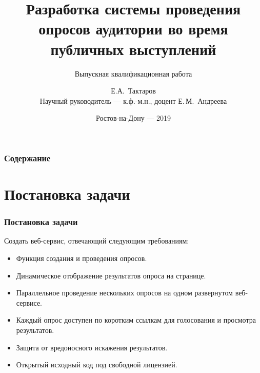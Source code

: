 \documentclass{beamer}
\title[Выпускная квалификационная работа]{Разработка системы проведения опросов аудитории во время публичных выступлений} %
\subtitle{Выпускная квалификационная работа}
\author{Е.А.~Тактаров\\Научный руководитель ---  к.ф.-м.н., доцент Е.\,М.~Андреева} %
\institute[ИММиКН] %
{
Южный Федеральный Университет\\
Институт математики, механики и компьютерных наук им. И.И. Воровича  \\ %
02.03.02 — Фундаментальная информатика и информационные технологии
}
\date{Ростов-на-Дону --- 2019} %
\begin{document}
\begin{frame}
\titlepage %
\end{frame}

\begin{frame}
\frametitle{Содержание} %
\tableofcontents %
\end{frame}


\section{Постановка задачи}
\begin{frame}
\frametitle{Постановка задачи}
Создать веб-сервис, отвечающий следующим требованиям:
\begin{itemize}
	\item Функция создания и проведения опросов. 
	\item Динамическое отображение результатов опроса на странице.
	\item Параллельное проведение нескольких опросов на одном развернутом веб-сервисе.
	\item Каждый опрос доступен по коротким ссылкам для голосования и просмотра результатов.
	\item Защита от вредоносного искажения результатов. 
	\item Открытый исходный код под свободной лицензией.
\end{itemize}
\end{frame}

\end{document}
